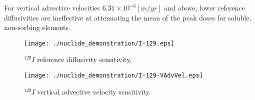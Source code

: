 
\begin{frame}[ctb!]
For vertical advective velocities 
$6.31\times10^{-6}[m/yr]$ and above, lower reference diffusivities are 
ineffective at attenuating the mean of the peak doses for soluble, non-sorbing 
elements. 

\begin{figure}[htp!]
\begin{minipage}[b]{0.45\linewidth}
\centering
\texttt{[image: ./nuclide\_demonstration/I-129.eps]}
\caption{$^{129}I$ reference diffusivity sensitivity.}
\label{fig:VAdvVelI129}

\end{minipage}
\hspace{0.05\linewidth}
\begin{minipage}[b]{0.45\linewidth}

\texttt{[image: ./nuclide\_demonstration/I-129-VAdvVel.eps]}
\caption{$^{129}I$ vertical advective velocity sensitivity.}
\label{fig:VAdvVelI129VAdvVel}

\end{minipage}
\end{figure}
\end{frame}

%
%

